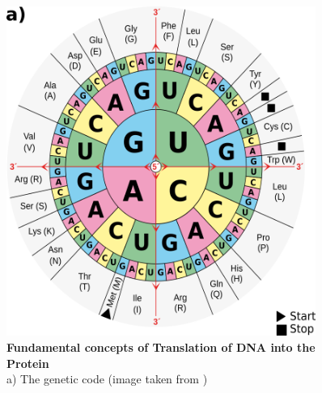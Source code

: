 \begin{figure}[tb]
    \centering
    \begin{minipage}[h]{0.9\textwidth}
      \centering
      \includegraphics[width=0.9\textwidth]{images/Mutations.png}
      \caption{\textbf{Fundamental concepts of Translation of DNA into the Protein}\\
      a) The genetic code (image taken from \textcite{bresch2013})}
     \label{fig:Codons}
    \end{minipage}
  \end{figure} 